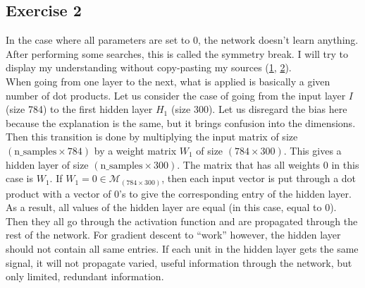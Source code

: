 \documentclass[12pt]{article}
\begin{document}
\subsection{Exercise 2}
In the case where all parameters are set to 0, the network doesn't learn anything. After performing some searches, this is called the symmetry break. I will try to display my understanding without copy-pasting my sources (\href{https://stats.stackexchange.com/questions/45087/why-doesnt-backpropagation-work-when-you-initialize-the-weights-the-same-value}{1}, \href{https://stackoverflow.com/questions/20027598/why-should-weights-of-neural-networks-be-initialized-to-random-numbers}{2}). \\
When going from one layer to the next, what is applied is basically a given number of dot products. Let us consider the case of going from the input layer $I$ (size 784) to the first hidden layer $H_1$ (size 300). Let us disregard the bias here because the explanation is the same, but it brings confusion into the dimensions. Then this transition is done by multiplying the input matrix of size $(\text{n\_samples} \times 784)$ by a weight matrix $W_1$ of size $(784 \times 300)$. This gives a hidden layer of size $(\text{n\_samples} \times 300)$. The matrix that has all weights 0 in this case is $W_1$. If $W_1 = 0 \in \mathcal{M}_{(784 \times 300)}$, then each input vector is put through a dot product with a vector of $0$'s to give the corresponding entry of the hidden layer. As a result, all values of the hidden layer are equal (in this case, equal to 0). Then they all go through the activation function and are propagated through the rest of the network. For gradient descent to ``work'' however, the hidden layer should not contain all same entries. If each unit in the hidden layer gets the same signal, it will not propagate varied, useful information through the network, but only limited, redundant information.
\end{document}
